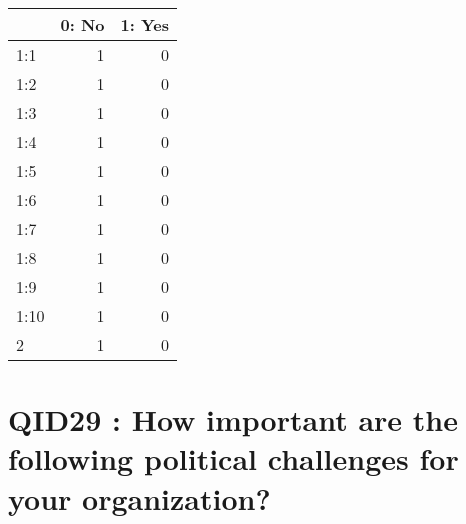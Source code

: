 \documentclass[]{article}
\begin{document}
\begin{table}[H]
\centering\begingroup\fontsize{30}{32}\selectfont

\begin{tabular}{l|r|r}
\hline
  & 0: No &  1: Yes\\
\hline
1:1 & 1 & 0\\
\hline
1:2 & 1 & 0\\
\hline
1:3 & 1 & 0\\
\hline
1:4 & 1 & 0\\
\hline
1:5 & 1 & 0\\
\hline
1:6 & 1 & 0\\
\hline
1:7 & 1 & 0\\
\hline
1:8 & 1 & 0\\
\hline
1:9 & 1 & 0\\
\hline
1:10 & 1 & 0\\
\hline
2 & 1 & 0\\
\hline
\end{tabular}
\endgroup{}
\end{table}

\section{QID29 : How important are the following political challenges
for your
organization?}\label{qid29-how-important-are-the-following-political-challenges-for-your-organization}
\end{document}
